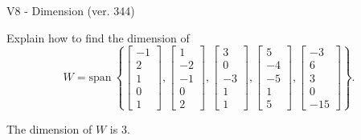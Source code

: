 \begin{exercise}
  \begin{exerciseTitle}V8 - Dimension (ver. 344)\end{exerciseTitle}
  \begin{exerciseStatement}
    Explain how to find the dimension of 
\[W=\mathrm{span}\ \left\{\left[\begin{array}{r}
-1 \\
2 \\
1 \\
0 \\
1
\end{array}\right] , \left[\begin{array}{r}
1 \\
-2 \\
-1 \\
0 \\
2
\end{array}\right] , \left[\begin{array}{r}
3 \\
0 \\
-3 \\
1 \\
1
\end{array}\right] , \left[\begin{array}{r}
5 \\
-4 \\
-5 \\
1 \\
5
\end{array}\right] , \left[\begin{array}{r}
-3 \\
6 \\
3 \\
0 \\
-15
\end{array}\right]\right\}.\]



  \end{exerciseStatement}
  \begin{exerciseAnswer}
   The dimension of \(W\) is  \(3\).
  


  \end{exerciseAnswer}
\end{exercise}
